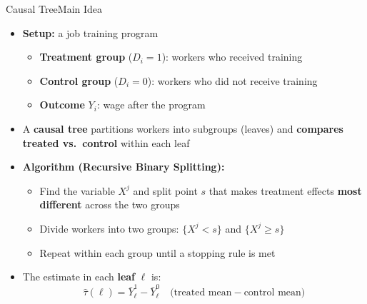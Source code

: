 \documentclass[dvipsnames,hyperref={pdfpagelabels=false}]{beamer}
\begin{document}
\begin{frame}{Causal Tree}{Main Idea}
	\begin{itemize}
		\item \textbf{Setup:} a job training program
		\vspace{0.15cm}
		\begin{itemize}
			\item \textbf{Treatment group} ($D_i = 1$): workers who received training
			\item \textbf{Control group} ($D_i = 0$): workers who did not receive training
			\item \textbf{Outcome} $Y_i$: wage after the program
		\end{itemize}
		\vspace{0.25cm}
		\item A \textbf{causal tree} partitions workers into subgroups (leaves) and \textbf{compares treated vs.\ control} within each leaf
		\vspace{0.25cm}
		\item \textbf{Algorithm (Recursive Binary Splitting):}
		\vspace{0.15cm}
		\begin{itemize}
			\item[1] Find the variable $X^j$ and split point $s$ that makes treatment effects \textbf{most different} across the two groups
			\vspace{0.15cm}
			\item[2] Divide workers into two groups: $\{X^j < s\}$ and $\{X^j \geq s\}$
			\vspace{0.15cm}
			\item[3] Repeat within each group until a stopping rule is met
		\end{itemize}
		\vspace{0.25cm}
		\item The estimate in each \textbf{leaf} $\ell$ is:
		\[
			\hat{\tau}(\ell) = \bar{Y}^{1}_\ell - \bar{Y}^{0}_\ell
			\quad \text{(treated mean} - \text{control mean)}
		\]
	\end{itemize}
\end{frame}
\end{document}
